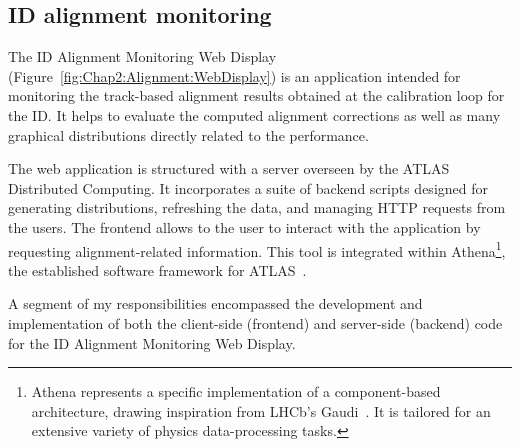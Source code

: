\subsection{ID alignment monitoring}
The ID Alignment Monitoring Web Display (Figure~\ref{fig:Chap2:Alignment:WebDisplay}) is an application intended for monitoring the track-based
alignment results obtained at the calibration loop for the ID. It helps to evaluate the computed 
alignment corrections as well as many graphical distributions directly related to the performance. 

The web application is structured with a server overseen by the ATLAS Distributed Computing.
It incorporates a suite of backend scripts designed for generating distributions, 
refreshing the data, and managing HTTP requests from the users. The frontend allows to the user
to interact with the application by requesting alignment-related information.  
This tool is integrated within Athena\footnote{Athena represents a specific implementation of a component-based architecture, drawing inspiration from LHCb's Gaudi~\cite{Mato:1998gfa}. It is tailored for an extensive variety of physics data-processing tasks.}, the established software framework for ATLAS~\cite{Duckeck:2005rb}.



A segment of my responsibilities encompassed the development and implementation
of both the client-side (frontend) and server-side (backend) 
code for the ID Alignment Monitoring Web Display. 

